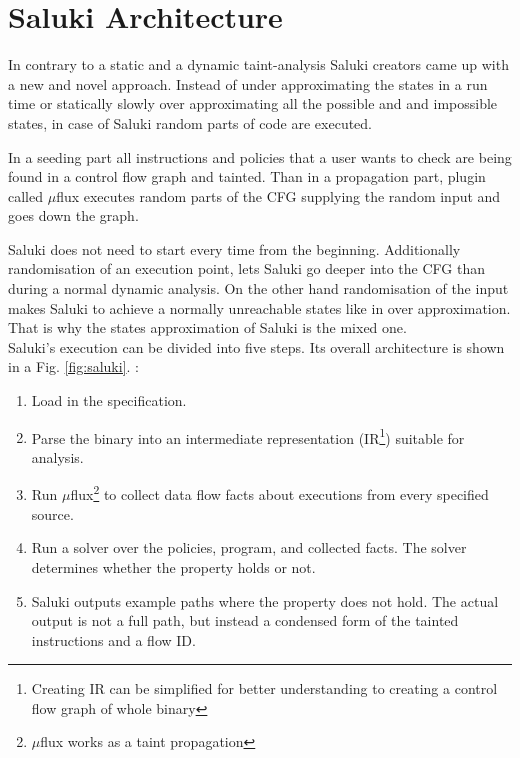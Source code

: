 \documentclass[a4paper, 12pt, journal, onecolumn]{IEEEtran}
\begin{document}
\section{Saluki Architecture}

In contrary to a static and a dynamic taint-analysis Saluki creators came up with a new and novel approach. Instead of under approximating the states in a run time or statically slowly over approximating all the possible and and impossible states, in case of Saluki random parts of code are executed. 

In a seeding part all instructions and policies that a user wants to check are being found in a control flow graph and tainted. Than in a propagation part, plugin called $\mu$flux executes random parts of the CFG supplying the random input and goes down the graph. 

Saluki does not need to start every time from the beginning. Additionally randomisation of an execution point, lets Saluki go deeper into the CFG than during a normal dynamic analysis. On the other hand randomisation of the input makes Saluki to achieve a normally unreachable states like in over approximation. That is why the states approximation of Saluki is the mixed one.
\\

Saluki's execution can be divided into five steps.
Its overall architecture is shown in a Fig. \ref{fig:saluki}.  \cite{saluki} :

\begin{enumerate}[label=\Alph*]
\item Load in the specification.
\item Parse the binary into an intermediate representation (IR\footnote{Creating IR can be simplified for better understanding to creating a control flow graph of whole binary}) suitable for analysis. 
\item Run $\mu$flux\footnote{$\mu$flux works as a taint propagation} to collect data flow facts about executions from every specified source.
\item Run a solver over the policies, program, and collected facts. The solver determines whether the property holds or not.
\item Saluki outputs example paths where the property does not hold. The actual output is not a full path, but instead a condensed form of the tainted instructions and a flow ID.
\end{enumerate}
\end{document}

